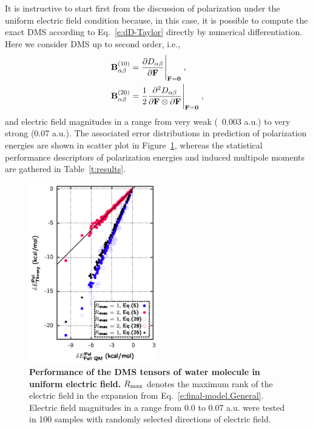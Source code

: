 \documentclass[aip,amsmath,amssymb,reprint,floatfix]{revtex4-1}
\begin{document}
It is instructive to start first from the discussion of polarization under the uniform electric field
condition because, in this case, it is possible to compute the exact DMS according to Eq.~\eqref{e:dD-Taylor} 
directly by numerical differentiation. Here we consider DMS up to second order, i.e.,
%
\begin{subequations}\label{e:exact-DMS}
 \begin{align}
  {\bf B}^{(10)}_{\alpha\beta} &= \frac{\partial D_{\alpha\beta}}{\partial {\bf F}}\Bigg|_{{\bf F}={\bf 0}} \;, \label{e:B10} \\
  {\bf B}^{(20)}_{\alpha\beta} &= \frac{1}{2} 
     \frac{\partial^2 D_{\alpha\beta}}{\partial {\bf F} \otimes \partial {\bf F}}\Bigg|_{{\bf F}={\bf 0}} \;, \label{e:B20}
 \end{align}
\end{subequations}
%
and electric field magnitudes in a range from very weak (~0.003 a.u.) to very strong (0.07 a.u.).
The associated error distributions in prediction of polarization energies 
are shown in scatter plot in Figure~\ref{f:fig-1}, whereas the
statistical performance descriptors of polarization energies and induced multipole moments
are gathered in Table~\ref{t:results}.
%
\begin{figure}[h]
\includegraphics[width=0.5\textwidth]{data/dmatpol/water/figure1/fig-1.eps}
\caption{\label{f:fig-1} {\bf Performance of the DMS tensors of water molecule
in uniform electric field.} 
$R_{\rm max}$ denotes the maximum rank of the electric field
in the expansion from Eq.~\eqref{e:final-model.General}.
Electric field magnitudes in a range from 0.0 to 0.07 a.u. were tested in 100 samples with randomly selected 
directions of electric field.
} 
\end{figure}
%
\end{document}
